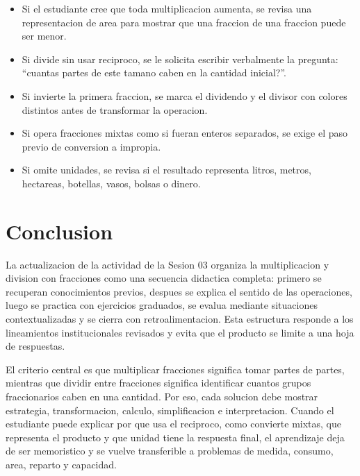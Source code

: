 \documentclass[
	spanish,
	letterpaper, oneside
]{article}
\begin{document}
\begin{itemize}
	\item Si el estudiante cree que toda multiplicacion aumenta, se revisa una representacion de area para mostrar que una fraccion de una fraccion puede ser menor.
	\item Si divide sin usar reciproco, se le solicita escribir verbalmente la pregunta: ``cuantas partes de este tamano caben en la cantidad inicial?''.
	\item Si invierte la primera fraccion, se marca el dividendo y el divisor con colores distintos antes de transformar la operacion.
	\item Si opera fracciones mixtas como si fueran enteros separados, se exige el paso previo de conversion a impropia.
	\item Si omite unidades, se revisa si el resultado representa litros, metros, hectareas, botellas, vasos, bolsas o dinero.
\end{itemize}

\section{Conclusion}

La actualizacion de la actividad de la Sesion 03 organiza la multiplicacion y division con fracciones como una secuencia didactica completa: primero se recuperan conocimientos previos, despues se explica el sentido de las operaciones, luego se practica con ejercicios graduados, se evalua mediante situaciones contextualizadas y se cierra con retroalimentacion. Esta estructura responde a los lineamientos institucionales revisados y evita que el producto se limite a una hoja de respuestas.

El criterio central es que multiplicar fracciones significa tomar partes de partes, mientras que dividir entre fracciones significa identificar cuantos grupos fraccionarios caben en una cantidad. Por eso, cada solucion debe mostrar estrategia, transformacion, calculo, simplificacion e interpretacion. Cuando el estudiante puede explicar por que usa el reciproco, como convierte mixtas, que representa el producto y que unidad tiene la respuesta final, el aprendizaje deja de ser memoristico y se vuelve transferible a problemas de medida, consumo, area, reparto y capacidad.

\end{document}

